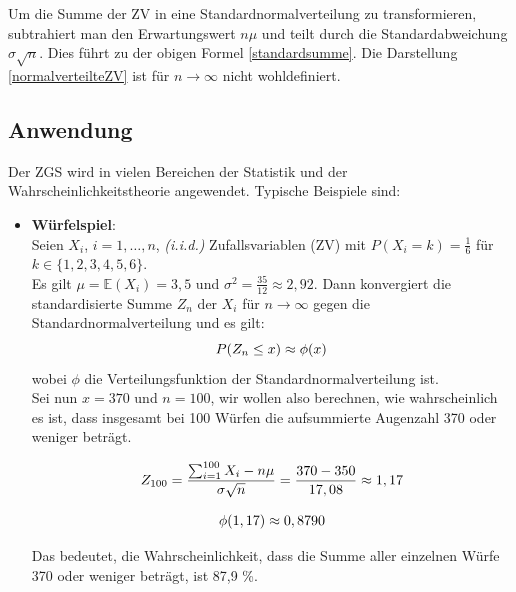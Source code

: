 \documentclass{article}
\begin{document}
Um die Summe der ZV in eine Standardnormalverteilung zu transformieren, subtrahiert man den Erwartungswert $n\mu$ und teilt durch die Standardabweichung $\sigma\sqrt{n}$. Dies führt zu der obigen Formel \eqref{standardsumme}. Die Darstellung \eqref{normalverteilteZV} ist für $n\to\infty$ nicht wohldefiniert.

\subsection{Anwendung}

Der ZGS wird in vielen Bereichen der Statistik und der Wahrscheinlichkeitstheorie angewendet. Typische Beispiele sind:

\begin{itemize}
    \item \textbf{Würfelspiel}: \\
    Seien $X_{i}$, $i = 1,\ldots,n$, \textit{(i.i.d.)} Zufallsvariablen (ZV) mit $P(X_{i} = k) = \frac{1}{6}$ für $k \in \{1,2,3,4,5,6\}$. \\Es gilt $\mu = \mathbb{E}(X_{i}) = 3,5$ und $\sigma^2 = \frac{35}{12} \approx 2,92$. Dann konvergiert die standardisierte Summe $Z_{n}$ der $X_{i}$ für $n \to \infty$ gegen die Standardnormalverteilung und es gilt:
    \begin{equation}
        P(Z_{n} \le x) \approx \phi(x) \notag
    \end{equation}
    wobei $\phi$ die Verteilungsfunktion der Standardnormalverteilung ist. \\Sei nun $x=370$ und $n=100$, wir wollen also berechnen, wie wahrscheinlich es ist, dass insgesamt bei 100 Würfen die aufsummierte Augenzahl 370 oder weniger beträgt.
    
    \begin{equation}
        Z_{100} = \frac{\sum_{i=1}^{100} X_{i} - n\mu}{\sigma\sqrt{n}} = \frac{370 - 350}{17,08} \approx 1,17 \notag 
    \end{equation}
    
    \begin{equation}
        \phi(1,17) \approx 0,8790 \notag
    \end{equation}
    
    Das bedeutet, die Wahrscheinlichkeit, dass die Summe aller einzelnen Würfe 370 oder weniger beträgt, ist 87,9 \%.
    

\end{itemize}
\end{document}
